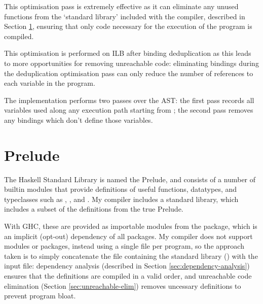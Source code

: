 \documentclass[dissertation.tex]{subfiles}
\begin{document}
{{        This optimisation pass is extremely effective as it can eliminate any unused functions from the `standard library' included with the compiler, described in Section \ref{sec:prelude}, ensuring that only code necessary for the execution of the program is compiled.

        This optimisation is performed on ILB after binding deduplication as this leads to more opportunities for removing unreachable code: eliminating bindings during the deduplication optimisation pass can only reduce the number of references to each variable in the program.

        The implementation performs two passes over the AST: the first pass records all variables used along any execution path starting from ; the second pass removes any bindings which don't define those variables.
    }
}
\section{Prelude}\label{sec:prelude}
{
    The Haskell Standard Library is named the Prelude, and consists of a number of builtin modules that provide definitions of useful functions, datatypes, and typeclasses such as , , and . My compiler includes a standard library, which includes a subset of the definitions from the true Prelude.
    
    With GHC, these are provided as importable modules from the  package, which is an implicit (opt-out) dependency of all packages. My compiler does not support modules or packages, instead using a single file per program, so the approach taken is to simply concatenate the file containing the standard library () with the input file: dependency analysis (described in Section \ref{sec:dependency-analysis}) ensures that the definitions are compiled in a valid order, and unreachable code elimination (Section \ref{sec:unreachable-elim}) removes uncessary definitions to prevent program bloat.
}
\end{document}
